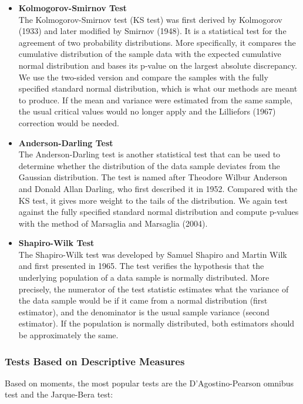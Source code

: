 \documentclass[12pt,a4paper]{article}
\newcommand{\head}[1]{\textbf{#1}\\}
\begin{document}
\begin{itemize}
\item \head{Kolmogorov-Smirnov Test}
The Kolmogorov-Smirnov test (KS test) was first derived by Kolmogorov (1933) and later modified by Smirnov (1948). It is a statistical test for the agreement of two probability distributions. More specifically, it compares the cumulative distribution of the sample data with the expected cumulative normal distribution and bases its p-value on the largest absolute discrepancy. We use the two-sided version and compare the samples with the fully specified standard normal distribution, which is what our methods are meant to produce. If the mean and variance were estimated from the same sample, the usual critical values would no longer apply and the Lilliefors (1967) correction would be needed.
\item \head{Anderson-Darling Test}
The Anderson-Darling test is another statistical test that can be used to determine whether the distribution of the data sample deviates from the Gaussian distribution. The test is named after Theodore Wilbur Anderson and Donald Allan Darling, who first described it in 1952. Compared with the KS test, it gives more weight to the tails of the distribution. We again test against the fully specified standard normal distribution and compute p-values with the method of Marsaglia and Marsaglia (2004).
\item \head{Shapiro-Wilk Test}
The Shapiro-Wilk test was developed by Samuel Shapiro and Martin Wilk and first presented in 1965. The test verifies the hypothesis that the underlying population of a data sample is normally distributed. More precisely, the numerator of the test statistic estimates what the variance of the data sample would be if it came from a normal distribution (first estimator), and the denominator is the usual sample variance (second estimator). If the population is normally distributed, both estimators should be approximately the same.
\end{itemize}

\subsubsection{Tests Based on Descriptive Measures}

Based on moments, the most popular tests are the D'Agostino-Pearson omnibus test and the Jarque-Bera test:
\end{document}
